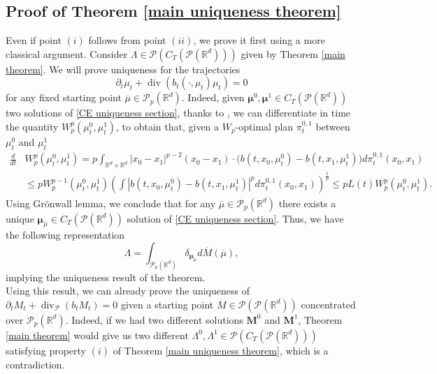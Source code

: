 \documentclass[10pt,leqno]{amsart}
\numberwithin{equation}{section}
\newcommand{\R}{\mathbb{R}}
\newcommand{\PP}{\mathcal{P}}
\begin{document}
\subsection{Proof of Theorem \ref{main uniqueness theorem}}
Even if point $(i)$ follows from point $(ii)$, we prove it first using a more classical argument. Consider $\Lambda\in \PP(C_T(\PP(\R^d)))$ given by Theorem \ref{main theorem}. We will prove uniqueness for the trajectories 
\begin{equation}\label{CE uniqueness section}
\partial_t\mu_t + \operatorname{div}(b_t(\cdot,\mu_t)\mu_t) = 0
\end{equation}
for any fixed starting point $\overline{\mu}\in \PP_p(\R^d)$. Indeed, given $\boldsymbol{\mu}^0, \boldsymbol{\mu}^1\in C_T(\PP(\R^d))$  two solutions of \eqref{CE uniqueness section}, thanks to \cite[Theorem 8.4.7 and Remark 8.4.8]{ambrosio2005gradient}, we can differentiate in time the quantity $W_p^p(\mu_t^0,\mu_t^1)$, to obtain that, given a $W_p$-optimal plan $\pi_t^{0,1} $ between $\mu_t^0$ and $\mu_t^1$
    \begin{align*}
        \frac{d}{dt} & W_p^p(
        \mu_t^0,\mu_t^1
        )  = p\int_{\R^d\times\R^d} |x_0-x_1|^{p-2}(x_0-x_1)\cdot \big(b(t,x_0,\mu_t^0) - b(t,x_1,\mu_t^1)\big) d\pi_t^{0,1}(x_0,x_1)
        \\
        & \leq
        pW_p^{p-1}(\mu_t^0,\mu_t^1)\left(\int |b(t,x_0,\mu_t^0) - b(t,x_1,\mu_t^1)|^p d\pi_t^{0,1}(x_0,x_1) \right)^{\frac{1}{p}}
        \leq
        pL(t)W_p^p(\mu_t^0,\mu_t^1).
    \end{align*}
    Using Gr\"onwall lemma, we conclude that for any $\overline{\mu}\in \PP_p(\R^d)$ there exists a unique $\boldsymbol{\mu}_{\overline{\mu}}\in C_T(\PP(\R^d))$ solution of \eqref{CE uniqueness section}. Thus, we have the following representation 
    \begin{equation}
        \Lambda = \int_{\PP_p(\R^d)} \delta_{\boldsymbol{\mu}_{\overline{\mu}}} d\overline{M}(\overline{\mu}),
    \end{equation}
    implying the uniqueness result of the theorem. 
    \\
    Using this result, we can already prove the uniqueness of $\partial_tM_t+\operatorname{div}_\PP(b_tM_t)=0$ given a starting point $\overline{M}\in \PP(\PP(\R^d))$ concentrated over $\PP_p(\R^d)$. Indeed, if we had two different solutions $\boldsymbol{M}^0$ and $\boldsymbol{M}^1$, Theorem \ref{main theorem} would give us two different $\Lambda^0,\Lambda^1 \in \PP(C_T(\PP(\R^d)))$ satisfying property $(i)$ of Theorem \ref{main uniqueness theorem}, which is a contradiction. 
\end{document}
